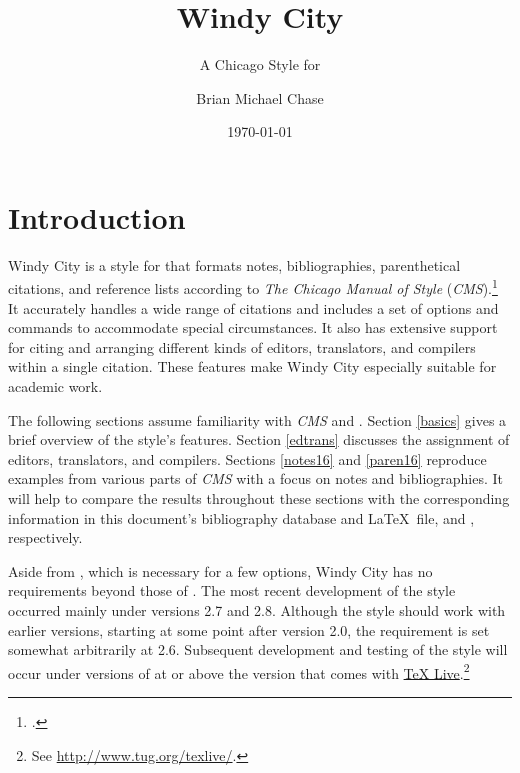 \documentclass[11pt,letterpaper,oneside]{article}
\begin{document}
\title{Windy City}
\subtitle{A Chicago Style for \biblatex}
\author{Brian Michael Chase}
\date{\today}
\maketitle
\tableofcontents{}

\newpage

\section{Introduction}
\label{intro}


Windy City is a style for \biblatex that formats notes,
bibliographies, parenthetical citations, and reference lists according
to \textit{The Chicago Manual of Style}
(\textit{CMS}).\footcite{chicago2010} It accurately handles a wide
range of citations and includes a set of options and commands to
accommodate special circumstances. It also has extensive support for
citing and arranging different kinds of editors, translators, and
compilers within a single citation. These features make Windy City
especially suitable for academic work.

The following sections assume familiarity with \textit{CMS} and
\biblatex. Section \ref{basics} gives a brief overview of the style's
features. Section \ref{edtrans} discusses the assignment of editors,
translators, and compilers. Sections \ref{notes16} and \ref{paren16}
reproduce examples from various parts of \textit{CMS} with a focus on
notes and bibliographies. It will help to compare the results
throughout these sections with the corresponding information in this
document's bibliography database and \LaTeX\ file,
 and , respectively.

Aside from \biber, which is necessary for a few options, Windy City
has no requirements beyond those of \biblatex. The most recent
development of the style occurred mainly under \biblatex versions 2.7
and 2.8. Although the style should work with earlier versions,
starting at some point after version 2.0, the requirement is set
somewhat arbitrarily at 2.6. Subsequent development and testing of the
style will occur under versions of \biblatex at or above the version
that comes with \href{http://www.tug.org/texlive/}{TeX
Live}.\footnote{See \url{http://www.tug.org/texlive/}.}
\end{document}
